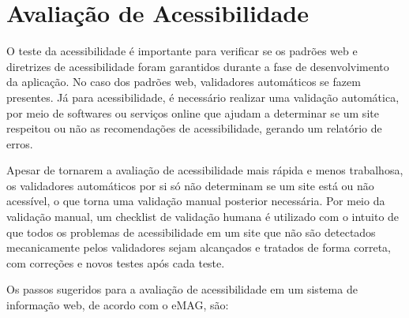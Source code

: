 \documentclass[
  12pt,
  openright,
  twoside,
  a4paper,
  english,
  french,
  spanish,
  brazil
]{abntex2}
\begin{document}
\section{Avaliação de Acessibilidade}

O teste da acessibilidade é importante para verificar se os padrões web e
diretrizes de acessibilidade foram garantidos durante a fase de desenvolvimento
da aplicação. No caso dos padrões web, validadores automáticos se fazem
presentes. Já para acessibilidade, é necessário realizar uma validação
automática, por meio de softwares ou serviços online que ajudam a determinar se
um site respeitou ou não as recomendações de acessibilidade, gerando um
relatório de erros.

Apesar de tornarem a avaliação de acessibilidade mais rápida e menos trabalhosa,
os validadores automáticos por si só não determinam se um site está ou não
acessível, o que torna uma validação manual posterior necessária. Por meio da
validação manual, um checklist de validação humana é utilizado com o intuito de
que todos os problemas de acessibilidade em um site que não são detectados
mecanicamente pelos validadores sejam alcançados e tratados de forma correta,
com correções e novos testes após cada teste.

Os passos sugeridos para a avaliação de acessibilidade em um sistema de
informação web, de acordo com o eMAG, são:
\end{document}

